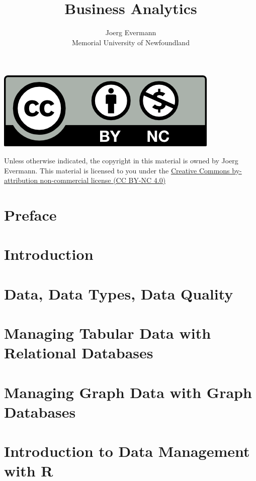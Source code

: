 \documentclass{book}
\title{Business Analytics}
\author{Joerg Evermann\\
Memorial University of Newfoundland}
\begin{document}
\frontmatter 

\maketitle

\vfill
\begin{center}
\includegraphics[height=.5in]{by-nc.png}

Unless otherwise indicated, the copyright in this material is owned by Joerg Evermann. This material is licensed to you under the \href{https://creativecommons.org/licenses/by-nc/4.0/}{Creative Commons by-attribution non-commercial license (CC BY-NC 4.0)}
\end{center}

\tableofcontents
\listoffigures
\listoftables

\chapter{Preface}


\mainmatter

\graphicspath{{class01/}}
\chapter{Introduction}


\graphicspath{{class02/}}
\chapter{Data, Data Types, Data Quality}


\graphicspath{{class03/}}
\chapter{Managing Tabular Data with Relational Databases}


\graphicspath{{class04/}}
\chapter{Managing Graph Data with Graph Databases}


\graphicspath{{class05/}}
\chapter{Introduction to Data Management with R}

\end{document}
